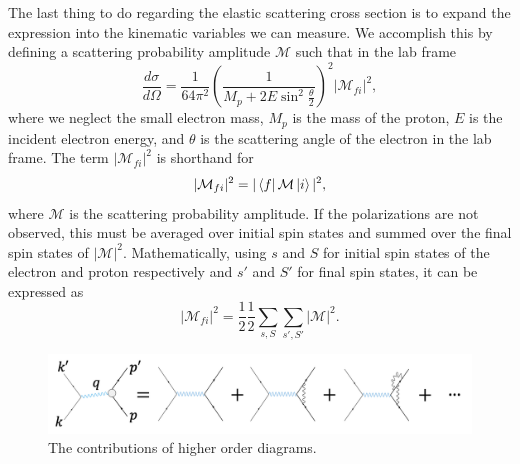 The last thing to do regarding the elastic scattering cross section is to expand the expression into the kinematic variables we can measure. We accomplish this by defining a scattering probability amplitude $\mathcal{M}$ such that in the lab frame
\begin{equation}
\frac{d\sigma}{d\Omega} = \frac{1}{64\pi^2} \left( \frac{1}{M_p + 2E \sin^2 \frac{\theta}{2}} \right)^2 |\mathcal{M}_{fi}|^2,
\end{equation} 
where we neglect the small electron mass, $M_p$ is the mass of the proton, $E$ is the incident electron energy, and $\theta$ is the scattering angle of the electron in the lab frame. The term $|\mathcal{M}_{fi}|^2$ is shorthand for
\begin{equation}
|\mathcal{M}_{fi}|^2 = |\bra{f} \mathcal{M} \ket{i}|^2,
\end{equation}
where $\mathcal{M}$ is the scattering probability amplitude. If the polarizations are not observed, this must be averaged over initial spin states and summed over the final spin states of $|\mathcal{M}|^2$. Mathematically, using $s$ and $S$ for initial spin states of the electron and proton respectively and $s'$ and $S'$ for final spin states, it can be expressed as
\begin{equation}
|\mathcal{M}_{fi}|^2 = \frac{1}{2} \frac{1}{2} \sum_{s,S} \sum_{s',S'} |\mathcal{M}|^2.
\end{equation}

\begin{figure}[h!]
	\centering
	\includegraphics[width=\linewidth]{figures/feyn_sum.png}
	\caption{The contributions of higher order diagrams.}
	\label{fig:feyn_sum}
\end{figure}

